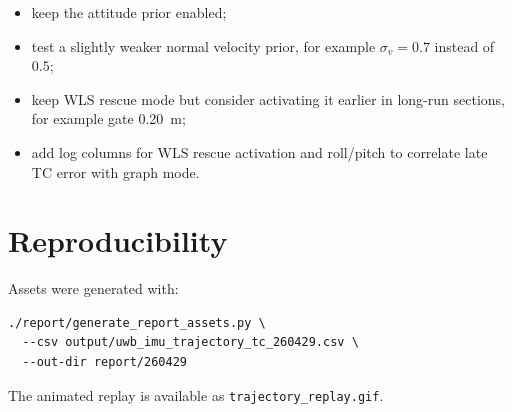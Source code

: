 \documentclass[11pt,a4paper]{article}
\begin{document}
\begin{itemize}[leftmargin=*]
  \item keep the attitude prior enabled;
  \item test a slightly weaker normal velocity prior, for example \(\sigma_v=0.7\) instead of \(0.5\);
  \item keep WLS rescue mode but consider activating it earlier in long-run sections, for example gate \SI{0.20}{m};
  \item add log columns for WLS rescue activation and roll/pitch to correlate late TC error with graph mode.
\end{itemize}

\section{Reproducibility}

Assets were generated with:
\begin{verbatim}
./report/generate_report_assets.py \
  --csv output/uwb_imu_trajectory_tc_260429.csv \
  --out-dir report/260429
\end{verbatim}

The animated replay is available as \texttt{trajectory\_replay.gif}.
\end{document}
